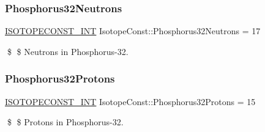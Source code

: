 \subsubsection{\texorpdfstring{Phosphorus32\+Neutrons}{Phosphorus32Neutrons}}
{\footnotesize\ttfamily \mbox{\hyperlink{group___isotope_const-_macros_ga5f18360b3e99483a35c32d789e62621c}{I\+S\+O\+T\+O\+P\+E\+C\+O\+N\+S\+T\+\_\+\+I\+NT}} Isotope\+Const\+::\+Phosphorus32\+Neutrons = 17}

\$ \$ Neutrons in Phosphorus-\/32. \mbox{\label{group___isotope_const-_phosphorus-_p32_ga5f777da531958c8af57ef7df53fe6c45}} 
\subsubsection{\texorpdfstring{Phosphorus32\+Protons}{Phosphorus32Protons}}
{\footnotesize\ttfamily \mbox{\hyperlink{group___isotope_const-_macros_ga5f18360b3e99483a35c32d789e62621c}{I\+S\+O\+T\+O\+P\+E\+C\+O\+N\+S\+T\+\_\+\+I\+NT}} Isotope\+Const\+::\+Phosphorus32\+Protons = 15}

\$ \$ Protons in Phosphorus-\/32. 